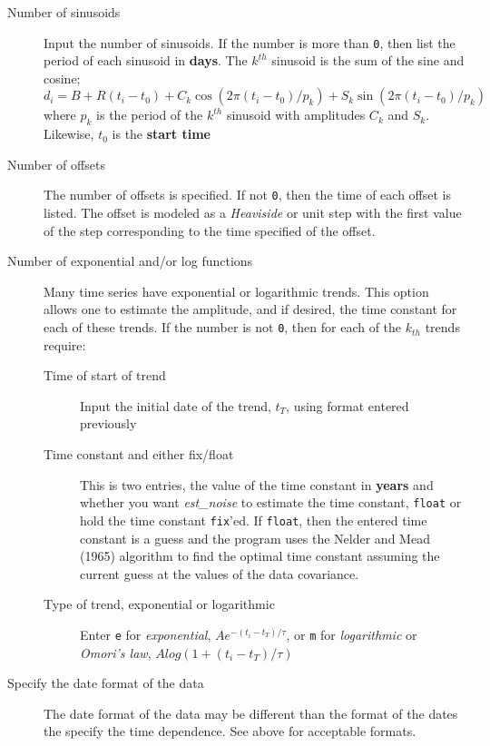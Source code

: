 \documentclass[12pt]{amsart}
\begin{document}
\begin{description}
\item[Number of sinusoids] Input the number of sinusoids. If the number is more than \texttt{0}, then list the
period of each sinusoid in \textbf{days}. The $k^{th}$ sinusoid is the sum of the sine and cosine;
\begin{equation}
d_i  = B + R (t_i - t_0) + C_k \cos (2 {\pi}(t_i - t_0)/{p_k})+ S_k \sin (2 {\pi}(t_i - t_0)/{p_k})
\end{equation}
where $p_k$ is the period of the $k^{th}$ sinusoid with amplitudes $C_k$ and $S_k$.  Likewise, $t_0$ is the \textbf{start time}

\item[Number of offsets] The number of offsets is specified. If not \texttt{0}, then the time of each offset
is listed. The offset is modeled as a \textit{Heaviside} or unit step with the first value of the step corresponding
to the time specified of the offset.

\item[Number of exponential and/or log functions]  Many time series have exponential or logarithmic trends. This
option allows one to estimate the amplitude, and if desired, the time constant for each of these trends. If the number
is not \texttt{0}, then for each of the $k_{th}$ trends require:
\begin{description}
\item[Time of start of trend] Input the initial date of the trend, $t_T$, using format entered previously
\item[Time constant and either fix/float] This is two entries, the value of the time constant in \textbf{years} and
whether you want \textit{est\_noise} to estimate the time constant, \texttt{float} or hold the time constant \texttt{fix}'ed.
If \texttt{float}, then the entered time constant is a guess and the program uses the Nelder and Mead (1965) algorithm
to find the optimal time constant assuming the current guess at the values of the data covariance.
\item[ Type of trend, exponential or logarithmic] Enter \texttt{e} for \textit{exponential}, $A e ^{-(t_i - t_T)/{\tau}}$, or
\texttt{m} for \textit{logarithmic} or \textit{Omori's law}, $A log (1 + {(t_i - t_T)/{\tau}})$
\end{description}

\item[Specify the date format of the data] The date format of the data may be different than the format of the dates
the specify the time dependence. See above for acceptable formats.


\end{description}
\end{document}
